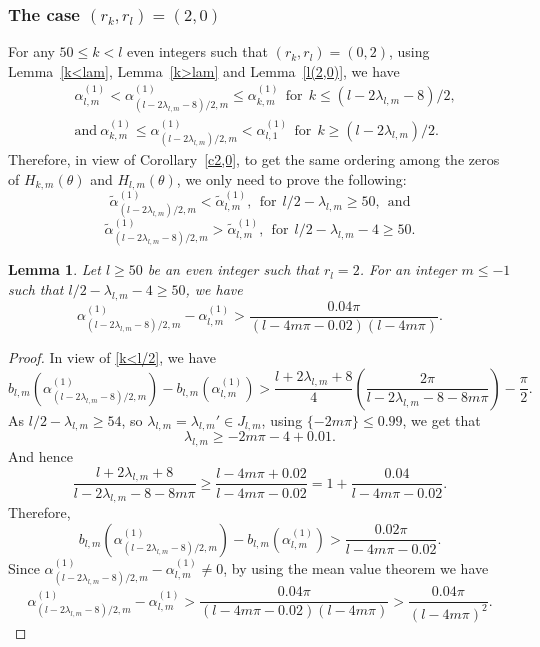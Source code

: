 \documentclass[12pt,reqno]{amsart}
\newtheorem{lem}{Lemma}
\newcommand{\lemref}[1]{Lemma~\ref{#1}}
\newcommand{\corref}[1]{Corollary~\ref{#1}}
\begin{document}
\subsubsection{The case $(r_k,r_l)=(2,0)$}
For any $50\le k<l$ even integers such that $(r_k,r_l)=(0,2)$, using \lemref{k<lam}, \lemref{k>lam} and \lemref{l(2,0)}, we have
\begin{align*}
&\alpha_{l,m}^{(1)}<\alpha_{(l-2\lambda_{l,m}-8)/2,m}^{(1)}\le\alpha_{k,m}^{(1)} \ \ \text{for}\ \
k\le (l-2\lambda_{l,m}-8)/2, \\
&\text{and}\ \alpha_{k,m}^{(1)}\le \alpha_{(l-2\lambda_{l,m})/2,m}^{(1)}<\alpha_{l,1}^{(1)}
\ \ \text{for}\ \ k\ge (l-2\lambda_{l,m})/2.
\end{align*}
Therefore, in view of \corref{c2,0}, to get the same ordering among the zeros of 
$H_{k,m}(\theta)$ and $H_{l,m}(\theta)$, we only need to prove the following:
$$
    \tilde\alpha_{(l-2\lambda_{l,m})/2,m}^{(1)}<\tilde\alpha_{l,m}^{(1)}, \ \ \text{for}\ \ l/2-\lambda_{l,m}\ge 50,\ \  \text{and}
    $$
    $$
\tilde\alpha_{(l-2\lambda_{l,m}-8)/2,m}^{(1)}>\tilde\alpha_{l,m}^{(1)},    \ \ \text{for}\ \ l/2-\lambda_{l,m}-4\ge50.
$$





\begin{lem}\label{lk<l/2}
Let $l\ge50$ be an even integer such that $r_l=2$. For an integer $m\le -1$ such that
$l/2-\lambda_{l,m}-4\ge 50$, we have
$$
\alpha_{(l-2\lambda_{l,m}-8)/2,m}^{(1)}-\alpha_{l,m}^{(1)}>\frac{0.04\pi}{(l-4m\pi-0.02)(l-4m\pi)}.
$$
\end{lem}

\begin{proof}
In view of \eqref{k<l/2}, we have
\begin{equation*}
b_{l,m}(\alpha_{(l-2\lambda_{l,m}-8)/2,m}^{(1)})-b_{l,m}(\alpha_{l,m}^{(1)})>\frac{l+2\lambda_{l,m}+8}{4}\left(\frac{2\pi}{l-2\lambda_{l,m}-8-8m\pi}\right)-\frac{\pi}{2}.
\end{equation*}
As $l/2-\lambda_{l,m}\ge 54$, so $\lambda_{l,m}=\lambda_{l,m}'\in J_{l,m}$, using $\{-2m\pi\}\le 0.99$, we get that
$$
\lambda_{l,m}\ge -2m\pi-4+0.01.
$$
And hence
$$
\frac{l+2\lambda_{l,m}+8}{l-2\lambda_{l,m}-8-8m\pi}\ge \frac{l-4m\pi+0.02}{l-4m\pi-0.02}=1+\frac{0.04}{l-4m\pi-0.02}.
$$
Therefore,
$$
b_{l,m}(\alpha_{(l-2\lambda_{l,m}-8)/2,m}^{(1)})-b_{l,m}(\alpha_{l,m}^{(1)})>\frac{0.02\pi}{l-4m\pi-0.02}.
$$
Since $\alpha_{(l-2\lambda_{l,m}-8)/2,m}^{(1)}-\alpha_{l,m}^{(1)}\neq0$, by using the mean value theorem we
have
$$
\alpha_{(l-2\lambda_{l,m}-8)/2,m}^{(1)}-\alpha_{l,m}^{(1)}>\frac{0.04\pi}{(l-4m\pi-0.02)(l-4m\pi)}>\frac{0.04\pi}{(l-4m\pi)^2}.
$$
\end{proof}
\end{document}
